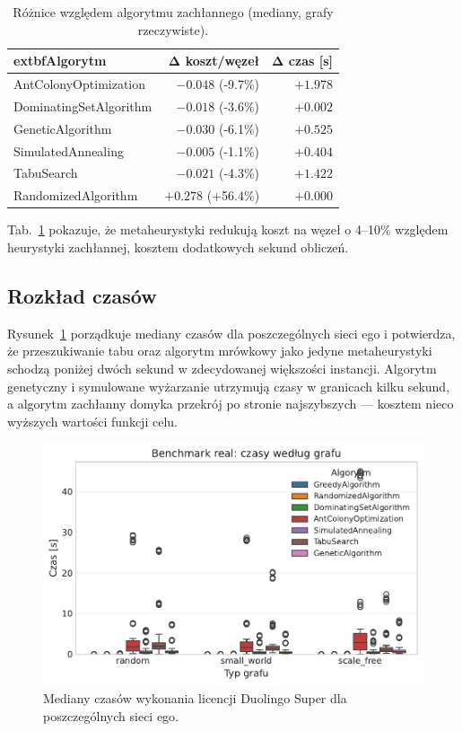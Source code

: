 \begin{table}[H]
  \centering
  \caption{Różnice względem algorytmu zachłannego (mediany, grafy rzeczywiste).}
  \label{tab:duo-real-gaps}
  \begin{tabular}{lrr}
    \toprule
    extbf{Algorytm}        & \textbf{Δ koszt/węzeł} & \textbf{Δ czas [s]} \\
    \midrule
    AntColonyOptimization  & $-0.048$ (-9.7\%)      & $+1.978$            \\
    DominatingSetAlgorithm & $-0.018$ (-3.6\%)      & $+0.002$            \\
    GeneticAlgorithm       & $-0.030$ (-6.1\%)      & $+0.525$            \\
    SimulatedAnnealing     & $-0.005$ (-1.1\%)      & $+0.404$            \\
    TabuSearch             & $-0.021$ (-4.3\%)      & $+1.422$            \\
    RandomizedAlgorithm    & $+0.278$ (+56.4\%)     & $+0.000$            \\
    \bottomrule
  \end{tabular}
\end{table}

Tab.~\ref{tab:duo-real-gaps} pokazuje, że metaheurystyki redukują koszt na węzeł o 4--10\% względem heurystyki zachłannej, kosztem dodatkowych sekund obliczeń.

\subsection{Rozkład czasów}

Rysunek~\ref{fig:duo-real-time} porządkuje mediany czasów dla poszczególnych sieci ego i potwierdza, że przeszukiwanie tabu oraz algorytm mrówkowy jako jedyne metaheurystyki schodzą poniżej dwóch sekund w zdecydowanej większości instancji. Algorytm genetyczny i symulowane wyżarzanie utrzymują czasy w granicach kilku sekund, a algorytm zachłanny domyka przekrój po stronie najszybszych — kosztem nieco wyższych wartości funkcji celu.

\begin{figure}[H]
  \centering
  \includegraphics[width=0.6\linewidth]{assets/figures/benchmark/real/time_by_graph.pdf}
  \caption{Mediany czasów wykonania licencji Duolingo Super dla poszczególnych sieci ego.}
  \label{fig:duo-real-time}
\end{figure}

